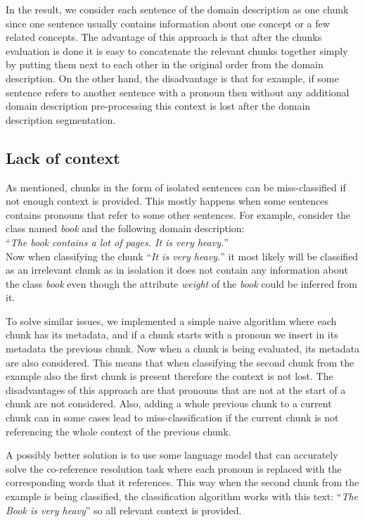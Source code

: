 In the result, we consider each sentence of the domain description as one chunk since one sentence usually contains information about one concept or a few related concepts. The advantage of this approach is that after the chunks evaluation is done it is easy to concatenate the relevant chunks together simply by putting them next to each other in the original order from the domain description. On the other hand, the disadvantage is that for example, if some sentence refers to another sentence with a pronoun then without any additional domain description pre-processing this context is lost after the domain description segmentation.


\subsection{Lack of context}

As mentioned, chunks in the form of isolated sentences can be miss-classified if not enough context is provided. This mostly happens when some sentences contains pronouns that refer to some other sentences. For example, consider the class named \textit{book} and the following domain description: \\

\noindent{}``\textit{The book contains a lot of pages. It is very heavy.}'' \\

\noindent{}Now when classifying the chunk ``\textit{It is very heavy.}'' it most likely will be classified as an irrelevant chunk as in isolation it does not contain any information about the class \textit{book} even though the attribute \textit{weight} of the \textit{book} could be inferred from it.

To solve similar issues, we implemented a simple naive algorithm where each chunk has its metadata, and if a chunk starts with a pronoun we insert in its metadata the previous chunk. Now when a chunk is being evaluated, its metadata are also considered. This means that when classifying the second chunk from the example also the first chunk is present therefore the context is not lost. The disadvantages of this approach are that pronouns that are not at the start of a chunk are not considered. Also, adding a whole previous chunk to a current chunk can in some cases lead to miss-classification if the current chunk is not referencing the whole context of the previous chunk.

A possibly better solution is to use some language model that can accurately solve the co-reference resolution task where each pronoun is replaced with the corresponding words that it references. This way when the second chunk from the example is being classified, the classification algorithm works with this text: ``\textit{The Book is very heavy}'' so all relevant context is provided. \\

